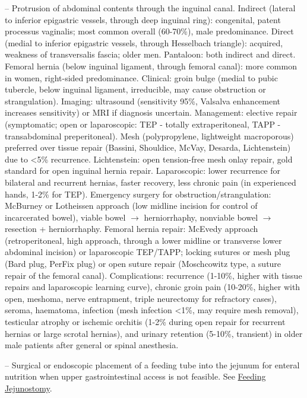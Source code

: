 -- Protrusion of abdominal contents through the inguinal canal. Indirect (lateral to inferior epigastric vessels, through deep inguinal ring): congenital, patent processus vaginalis; most common overall (60-70\%), male predominance. Direct (medial to inferior epigastric vessels, through Hesselbach triangle): acquired, weakness of transversalis fascia; older men. Pantaloon: both indirect and direct. Femoral hernia (below inguinal ligament, through femoral canal): more common in women, right-sided predominance. Clinical: groin bulge (medial to pubic tubercle, below inguinal ligament, irreducible, may cause obstruction or strangulation). Imaging: ultrasound (sensitivity 95\%, Valsalva enhancement increases sensitivity) or MRI if diagnosis uncertain. Management: elective repair (symptomatic; open or laparoscopic: TEP - totally extraperitoneal, TAPP - transabdominal preperitoneal). Mesh (polypropylene, lightweight macroporous) preferred over tissue repair (Bassini, Shouldice, McVay, Desarda, Lichtenstein) due to <5\% recurrence. Lichtenstein: open tension-free mesh onlay repair, gold standard for open inguinal hernia repair. Laparoscopic: lower recurrence for bilateral and recurrent hernias, faster recovery, less chronic pain (in experienced hands, 1-2\% for TEP). Emergency surgery for obstruction/strangulation: McBurney or Lotheissen approach (low midline incision for control of incarcerated bowel), viable bowel $\rightarrow$ herniorrhaphy, nonviable bowel $\rightarrow$ resection + herniorrhaphy. Femoral hernia repair: McEvedy approach (retroperitoneal, high approach, through a lower midline or transverse lower abdominal incision) or laparoscopic TEP/TAPP; locking sutures or mesh plug (Bard plug, PerFix plug) or open suture repair (Moschcowitz type, a suture repair of the femoral canal). Complications: recurrence (1-10\%, higher with tissue repairs and laparoscopic learning curve), chronic groin pain (10-20\%, higher with open, meshoma, nerve entrapment, triple neurectomy for refractory cases), seroma, haematoma, infection (mesh infection <1\%, may require mesh removal), testicular atrophy or ischemic orchitis (1-2\% during open repair for recurrent hernias or large scrotal hernias), and urinary retention (5-10\%, transient) in older male patients after general or spinal anesthesia.

-- Surgical or endoscopic placement of a feeding tube into the jejunum for enteral nutrition when upper gastrointestinal access is not feasible. See \hyperlink{Feeding Jejunostomy}{Feeding Jejunostomy}.

